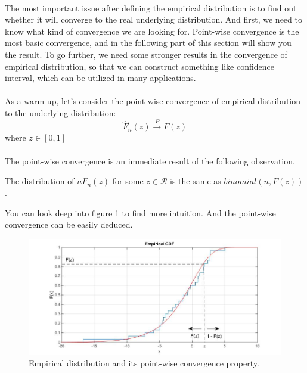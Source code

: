 \documentclass[final_project_1.tex]{subfiles}
\begin{document}
\paragraph{}
The most important issue after defining the empirical distribution is to find out whether it will converge to the real underlying distribution. And first, we need to know what kind of convergence we are looking for. Point-wise convergence is the most basic convergence, and in the following part of this section will show you the result. To go further, we need some stronger results in the convergence of empirical distribution, so that we can construct something like confidence interval, which can be utilized in many applications.



\paragraph{}
As a warm-up, let's consider the point-wise convergence of empirical distribution to the underlying distribution: 
$$\hat{F}_n(z)\xrightarrow{P}F(z)$$ 
where $z\in [0,1]$

\paragraph{}
The point-wise convergence is an immediate result of the following observation.
\begin{observation}
The distribution of $n\hat{F}_n(z)$ for some $z\in\mathcal{R}$ is the same as $binomial(n, F(z))$. \end{observation}
You can look deep into figure 1 to find more intuition. And the point-wise convergence can be easily deduced.
\begin{figure}[h]
\includegraphics[scale=0.4]{empiricaldistribution_1.jpg}
\caption{Empirical distribution and its point-wise convergence property.}
\end{figure}
\end{document}
